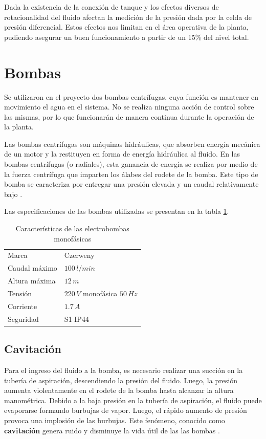 {\color{red}
Dada la existencia de la conexión de tanque y los efectos diversos de
rotacionalidad del fluido afectan
la medición de la presión dada por la celda de presión diferencial.
Estos efectos nos limitan en el
área operativa de la planta, pudiendo asegurar
un buen funcionamiento a partir de un 15\% del nivel
total.}

\section{Bombas}
\label{sec:Bombas}

Se utilizaron en el proyecto dos bombas centrífugas, cuya función es
mantener en movimiento el agua en el sistema.
No se realiza ninguna acción de control sobre las
mismas, por lo que funcionarán de manera continua durante la operación de la
planta.

Las bombas centrífugas son máquinas hidráulicas, que absorben energía mecánica
de un motor y la restituyen en forma de energía hidráulica al fluido.
En las bombas centrífugas (o radiales), esta ganancia de energía se realiza por
medio de la fuerza centrífuga que imparten los álabes del rodete de la bomba.
Este tipo de bomba se caracteriza por entregar una presión elevada y un caudal
relativamente bajo \cite{bib:Mataix}.

Las especificaciones de las bombas utilizadas se presentan en la tabla
\ref{tab:caractBombas}.

\begin{table}[t]
\centering
\begin{tabular}{|l|l|}
\hline
Marca & Czerweny\\
Caudal máximo &  $100\,l/min$\\
Altura máxima &  $12\,m$\\
Tensión & $220\,V$ monofásica $50\,Hz$\\
Corriente & $1.7\,A$\\
Seguridad & S1 IP44\\
\hline
\end{tabular}
\caption{Características de las electrobombas monofásicas}
\label{tab:caractBombas}
\end{table}

\subsection{Cavitación}
Para el ingreso del fluido a la bomba, es necesario realizar una succión
en la tubería de aspiración, descendiendo la presión del fluido.
Luego, la presión aumenta violentamente en el rodete de la bomba hasta alcanzar
la altura manométrica.
Debido a la baja presión en la tubería de aspiración, el fluido puede
evaporarse formando burbujas de vapor.
Luego, el rápido aumento de presión provoca una implosión de las burbujas.
Este fenómeno, conocido como \textbf{cavitación} genera ruido y disminuye la
vida útil de las las bombas \cite{bib:ApuntesMDFBombas}.

